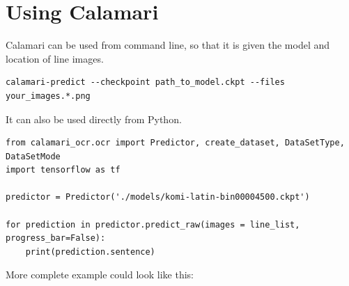 \documentclass[]{book}
\begin{document}
\hypertarget{using-calamari}{%
\section{Using Calamari}\label{using-calamari}}

Calamari can be used from command line, so that it is given the model and location of line images.

\begin{verbatim}
calamari-predict --checkpoint path_to_model.ckpt --files your_images.*.png
\end{verbatim}

It can also be used directly from Python.

\begin{verbatim}
from calamari_ocr.ocr import Predictor, create_dataset, DataSetType, DataSetMode
import tensorflow as tf

predictor = Predictor('./models/komi-latin-bin00004500.ckpt')

for prediction in predictor.predict_raw(images = line_list, progress_bar=False):
    print(prediction.sentence)
\end{verbatim}

More complete example could look like this:
\end{document}
